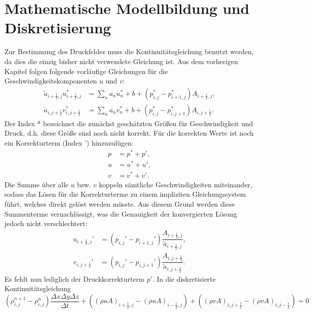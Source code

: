 \section{Mathematische Modellbildung und Diskretisierung}
Zur Bestimmung des Druckfeldes muss die Kontinuit\"atsgleichung benutzt werden, da dies die einzig bisher nicht verwendete Gleichung ist. Aus dem vorherigen Kapitel folgen folgende vorl\"aufige Gleichungen f\"ur die Geschwindigkeitskomponenten $u$ und $v$:
\begin{align}
\tilde{a}_{i+\frac{1}{2},j} u_{i+\frac{1}{2},j}^{*}&=\sum\limits_{n}a_{n} u_{n}^{*} + b + \left(p_{i,j}^{*}-p_{i+1,j}^{*}\right) A_{i+\frac{1}{2},j}, \\
\tilde{a}_{i,j+\frac{1}{2}} v_{i,j+\frac{1}{2}}^{*}&=\sum\limits_{n}a_{n} v_{n}^{*} + b + \left(p_{i,j}^{*}-p_{i,j+1}^{*}\right) A_{i,j+\frac{1}{2}}.
\end{align}
Der Index * bezeichnet die zun\"achst gesch\"atzten Gr\"o\ss{}en f\"ur Geschwindigkeit und Druck, d.h. diese Gr\"o\ss{}e sind noch nicht korrekt. F\"ur die korrekten Werte ist noch ein Korrekturterm (Index ') hinzuzuf\"ugen:
\begin{align}
p&=p^{*}+p', \\
u&=u^{*}+u', \\
v&=v^{*}+v'.
\end{align}
Die Summe \"uber alle $u$ bzw. $v$ koppeln s\"amtliche Geschwindigkeiten miteinander, sodass das L\"osen f\"ur die Korrekturterme zu einem impliziten Gleichungssystem f\"uhrt, welches direkt gel\"ost werden m\"usste. Aus diesem Grund werden diese Summenterme vernachl\"assigt, was die Genauigkeit der konvergierten L\"osung jedoch nicht verschlechtert:
\begin{align}
u_{i+\frac{1}{2},j}'&= \left(p_{i,j}'-p_{i+1,j}'\right) \dfrac{A_{i+\frac{1}{2},j}}{\tilde{a}_{i+\frac{1}{2},j}}, \label{eq:u'}\\
v_{i,j+\frac{1}{2}}'&= \left(p_{i,j}'-p_{i,j+1}'\right) \dfrac{A_{i,j+\frac{1}{2}}}{\tilde{a}_{i,j+\frac{1}{2}}}.\label{eq:v'}
\end{align}
Es fehlt nun lediglich der Druckkorrekturterm $p'$. In die diskretisierte Kontinuit\"atsgleichung 
\begin{equation} \label{eq:diskr_Konti}
\left(\rho_{i,j}^{n+1}-\rho_{i,j}^{n}\right)\dfrac{\Delta x\Delta y\Delta z}{\Delta t} + \left(\left(\rho u A\right)_{i+\frac{1}{2},j}-\left(\rho u A\right)_{i-\frac{1}{2},j}\right) + \left(\left(\rho v A\right)_{i,j+\frac{1}{2}}-\left(\rho v A\right)_{i,j-\frac{1}{2}}\right)=0
\end{equation}
